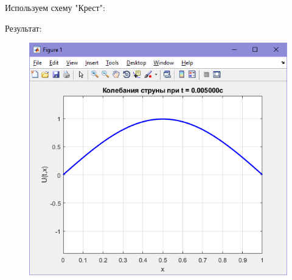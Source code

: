 \documentclass[a4paper]{article}
\begin{document}
\newpage

Используем схему "Крест": \\



\newpage

Результат:

\begin{figure}[h]
    \begin{center}
    \begin{minipage}[h]{0.4\linewidth}
    \includegraphics[width=1\linewidth]{img/result_1.png}
    \caption{} %
    \label{ris:experimoriginal}
    \end{minipage}
    \end{center}
\end{figure}
\end{document}
